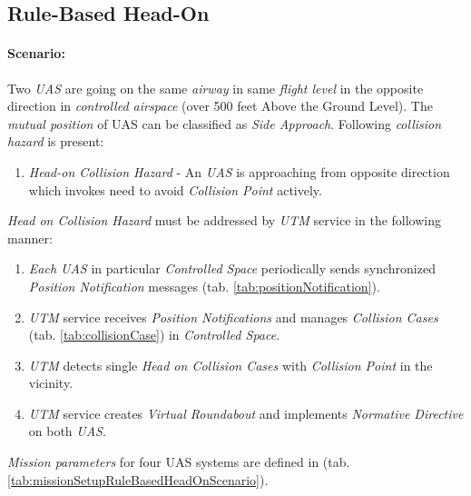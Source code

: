 \subsection{Rule-Based Head-On}\label{s:testRuleHeadOn}

\paragraph{Scenario:} Two \emph{UAS} are going on the same \emph{airway} in same \emph{flight level} in the opposite direction in \emph{controlled airspace} (over 500 feet Above the Ground Level). The \emph{mutual position} of UAS can be classified as \emph{Side Approach}. Following \emph{collision hazard} is present:

\begin{enumerate}
    \item \emph{Head-on Collision Hazard} - An \emph{UAS} is approaching from opposite direction which invokes need to avoid \emph{Collision Point} actively.
\end{enumerate}
      
\noindent\emph{Head on Collision Hazard} must be addressed by \emph{UTM} service in the following manner:
    
\begin{enumerate}
    \item \emph{Each UAS} in particular \emph{Controlled Space} periodically sends synchronized \emph{Position Notification} messages (tab. \ref{tab:positionNotification}). 
    
    \item \emph{UTM} service receives \emph{Position Notifications} and manages \emph{Collision Cases} (tab. \ref{tab:collisionCase}) in \emph{Controlled Space}. 
    
    \item \emph{UTM} detects single \emph{Head on Collision Cases} with \emph{Collision Point} in the vicinity.
    
    \item \emph{UTM} service creates \emph{Virtual Roundabout} and implements \emph{Normative Directive} on both \emph{UAS}.
\end{enumerate}

\noindent\emph{Mission parameters} for four UAS systems are defined in (tab. \ref{tab:missionSetupRuleBasedHeadOnScenario}).

